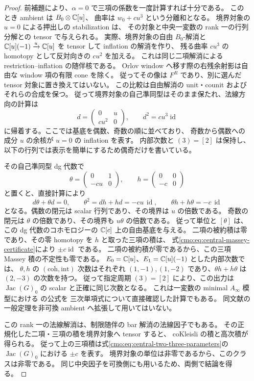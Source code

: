 \begin{proof}
前補題により、$\alpha=0$ で三項の係数を一度計算すれば十分である。
このとき ambient は $B_0\otimes\mathbb C[u]$、
曲率は $w_0+cu^3$ という分離和となる。
境界対象の $u=0$ による押出しの stabilization は、
その対象と中央一変数の rank 一の行列分解との tensor で与えられる。
実際、境界対象の自由 $B_0$-解消と
$\mathbb C[u](-1)\xrightarrow{u}\mathbb C[u]$ を tensor して inflation の解消を作り、
残る曲率 $cu^3$ の homotopy として反対向きの $cu^2$ を加える。
これは同じ二項解消による restriction--inflation の随伴核である。
Orlov window へ移す際の右残余射影は自由な window 項の有限 cone を除く。
従ってその像は $F^R$ であり、別に選んだ tensor 対象に置き換えてはいない。
この比較は自由解消の unit・counit およびそれらの合成を保つ。
従って境界対象の自己準同型はそのまま保たれ、法線方向の計算は
\[
 d=\begin{pmatrix}0&u\\cu^2&0\end{pmatrix},
 \qquad d^2=cu^3\operatorname{id}
\]
に帰着する。ここでは基底を偶数、奇数の順に並べており、
奇数から偶数への成分 $u$ の余核が $u=0$ の inflation を表す。
内部次数と $(3)=[2]$ は保持し、
以下の行列では表示を簡単にするため偶奇だけを書いている。

その自己準同型 dg 代数で
\[
 \theta=\begin{pmatrix}0&1\\-cu&0\end{pmatrix},
 \qquad h=\begin{pmatrix}0&0\\-c&0\end{pmatrix}
\]
と置くと、直接計算により
\begin{equation}\label{cmo:eq:central-massey-certificate}
 d\theta+\theta d=0,\qquad
 \theta^2=dh+hd=-cu\,\operatorname{id},\qquad
 \theta h+h\theta=-c\,\operatorname{id}
\end{equation}
となる。偶数の閉元は scalar 行列であり、その境界は $u$ の倍数である。
奇数の閉元は $\theta$ の倍数であり、その境界も $u\theta$ の倍数である。
従って単位と $[\theta]$ は、この dg 代数のコホモロジーの
$\mathbb C[c]$ 上の自由基底を与える。
二項の被約積は零であり、その零 homotopy を $h$ と取った三項の積は、
式\eqref{cmo:eq:central-massey-certificate}により
$\pm c\operatorname{id}$ である。
二項の被約積が零であるから、この三項 Massey 積の不定性も零である。
$E_0=\mathbb C[u]$、$E_1=\mathbb C[u](-1)$ とした内部次数では、
$\theta,h$ の $(\mathrm{coh},\mathrm{int})$ 次数はそれぞれ
$(1,-1),(1,-2)$ であり、$\theta h+h\theta$ は $(2,-3)$ の次数を持つ。
従って指定周期 $(3)=[2]$ により、この出力は
$\operatorname{Jac}(G)_0$ の scalar と正確に同じ次数となる。
これは一変数の minimal $A_\infty$ 模型における
\cite[Section~5.6, Theorem~5.8]{ROGDyckerhoff}の公式を
三次単項式について直接確認した計算でもある。
同文献の一般定理を非可換 ambient へ拡張して用いてはいない。

この rank 一の法線解消は、制限随伴の bar 解消の法線因子でもある。
その正規化した二項・三項の積を境界対象へ tensor すると、
coKleisli の積と高次積が得られる。
従って上の三項積は式\eqref{cmo:eq:central-two-three-parameters}の
$\operatorname{Jac}(G)_0$ における $\pm c$ を表す。
境界対象の単位は非零であるから、このクラスは非零である。
同じ中央因子を可換側にも用いるため、両側で結論を得る。
\end{proof}


